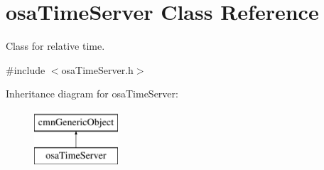 \hypertarget{classosa_time_server}{\section{osa\-Time\-Server Class Reference}
\label{classosa_time_server}
}


Class for relative time.  




{\ttfamily \#include $<$osa\-Time\-Server.\-h$>$}

Inheritance diagram for osa\-Time\-Server\-:\begin{figure}[H]
\begin{center}
\leavevmode
\includegraphics[height=2.000000cm]{d4/de7/classosa_time_server}
\end{center}
\end{figure}
